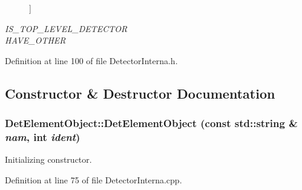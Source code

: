 \begin{Desc}
\begin{description}
{}]\item[{\em 
\hypertarget{class_d_d4hep_1_1_geometry_1_1_det_element_object_a04115ec0fa8d9df9b7d47ed45e9b037da7fc93a02de387e3a443e7f900157f2dd}{
IS\_\-TOP\_\-LEVEL\_\-DETECTOR}
\label{class_d_d4hep_1_1_geometry_1_1_det_element_object_a04115ec0fa8d9df9b7d47ed45e9b037da7fc93a02de387e3a443e7f900157f2dd}
}]\item[{\em 
\hypertarget{class_d_d4hep_1_1_geometry_1_1_det_element_object_a04115ec0fa8d9df9b7d47ed45e9b037da81ef79f7722d59d01cb24098b3b4492b}{
HAVE\_\-OTHER}
\label{class_d_d4hep_1_1_geometry_1_1_det_element_object_a04115ec0fa8d9df9b7d47ed45e9b037da81ef79f7722d59d01cb24098b3b4492b}
}]\end{description}
\end{Desc}



Definition at line 100 of file DetectorInterna.h.

\subsection{Constructor \& Destructor Documentation}
\hypertarget{class_d_d4hep_1_1_geometry_1_1_det_element_object_a2001d9608badcd67be58cdf9e8092ee8}{
\subsubsection[{DetElementObject}]{\setlength{\rightskip}{0pt plus 5cm}DetElementObject::DetElementObject (const std::string \& {\em nam}, \/  int {\em ident})}}
\label{class_d_d4hep_1_1_geometry_1_1_det_element_object_a2001d9608badcd67be58cdf9e8092ee8}


Initializing constructor. 

Definition at line 75 of file DetectorInterna.cpp.

